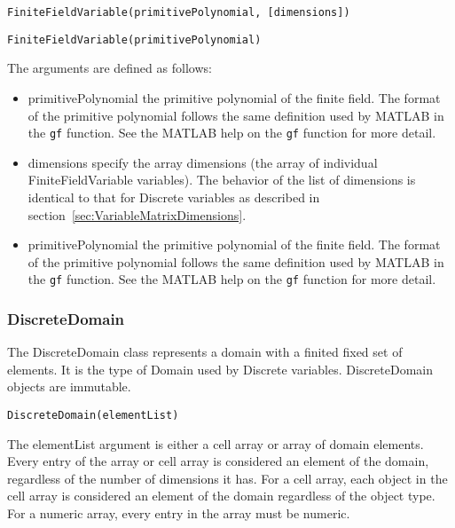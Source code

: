 \ifmatlab
\begin{lstlisting}
FiniteFieldVariable(primitivePolynomial, [dimensions])
\end{lstlisting}
\fi

\ifjava
\begin{lstlisting}
FiniteFieldVariable(primitivePolynomial)
\end{lstlisting}
\fi

The arguments are defined as follows:

\ifmatlab
\begin{itemize}
\item primitivePolynomial the primitive polynomial of the finite field.  The format of the primitive polynomial follows the same definition used by MATLAB in the \texttt{gf} function.  See the MATLAB help on the \texttt{gf} function for more detail.
\item dimensions specify the array dimensions (the array of individual FiniteFieldVariable variables).  The behavior of the list of dimensions is identical to that for Discrete variables as described in section~\ref{sec:VariableMatrixDimensions}.
\end{itemize}
\fi

\ifjava
\begin{itemize}
\item primitivePolynomial the primitive polynomial of the finite field.  The format of the primitive polynomial follows the same definition used by MATLAB in the \texttt{gf} function.  See the MATLAB help on the \texttt{gf} function for more detail.
\end{itemize}
\fi

\subsubsection{DiscreteDomain}
\label{sec:DiscreteDomain}

The DiscreteDomain class represents a domain with a finited fixed set of elements. It is the type of Domain used
by Discrete variables. DiscreteDomain objects are immutable.


\begin{lstlisting}
DiscreteDomain(elementList)
\end{lstlisting}

The elementList argument is either a cell array or array of domain elements.  Every entry of the array or cell array is considered an element of the domain, regardless of the number of dimensions it has.  For a cell array, each object in the cell array is considered an element of the domain regardless of the object type.  For a numeric array, every entry in the array must be numeric.

